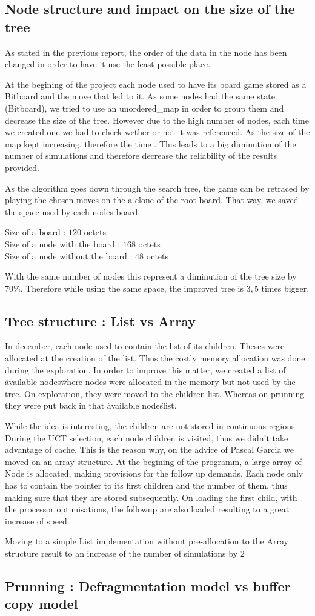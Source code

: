 \subsection{Node structure and impact on the size of the tree}

As stated in the previous report, the order of the data in the node has been changed in order to have it use the least possible place.

At the begining of the project each node used to have its board game stored as a Bitboard and the move that led to it. As some nodes had the same state (Bitboard), we tried to use an unordered\_map in order to group them and decrease the size of the tree. However due to the high number of nodes, each time we created one we had to check wether or not it was referenced. As the size of the map kept increasing, therefore the time . This leads to a big diminution of the number of simulations and therefore decrease the reliability of the results provided.

As the algorithm goes down through the search tree, the game can be retraced by playing the chosen moves on the a clone of the root board. That way, we saved the space used by each nodes board.

\noindent
Size of a board : $120$ octets\\
Size of a node with the board : $168$ octets\\
Size of a node without the board : $48$ octets

With the same number of nodes this represent a diminution of the tree size by $70\%$. Therefore while using the same space, the improved tree is $3,5$ times bigger.

\subsection{Tree structure : List vs Array}

In december, each node used to contain the list of its children. Theses were allocated at the creation of the list. Thus the costly memory allocation was done during the exploration.
In order to improve this matter, we created a list of \"available nodes\" where nodes were allocated in the memory but not used by the tree. On exploration, they were moved to the children list. Whereas on prunning they were put back in that \"available nodes\" list.

While the idea is interesting, the children are not stored in continuous regions. During the UCT selection, each node children is visited, thus we didn't take advantage of cache. This is the reason why, on the advice of Pascal Garcia we moved on an array structure. At the begining of the programm, a large array of Node is allocated, making provisions for the follow up demands. Each node only has to contain the pointer to its first children and the number of them, thus making sure that they are stored subsequently. On loading the first child, with the processor optimisations, the followup are also loaded resulting to a great increase of speed.

Moving to a simple List implementation without pre-allocation to the Array structure result to an increase of the number of simulations by 2

\subsection{Prunning : Defragmentation model vs buffer copy model}
